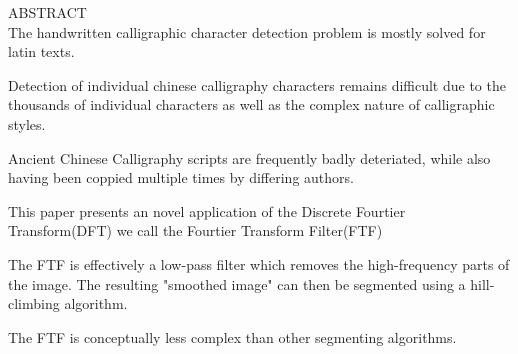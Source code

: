 ABSTRACT\\

The handwritten calligraphic character detection problem is mostly solved for latin texts.

Detection of individual chinese calligraphy characters remains difficult due to the thousands of individual characters as well as the complex nature of calligraphic styles.

Ancient Chinese Calligraphy scripts are frequently badly deteriated, while also having been coppied multiple times by differing authors.

This paper presents an novel application of the Discrete Fourtier Transform(DFT) we call the Fourtier Transform Filter(FTF)

The FTF is effectively a low-pass filter which removes the high-frequency parts of the image.  The resulting "smoothed image" can then be segmented using a hill-climbing algorithm.

The FTF is conceptually less complex than other segmenting algorithms.

\newpage

